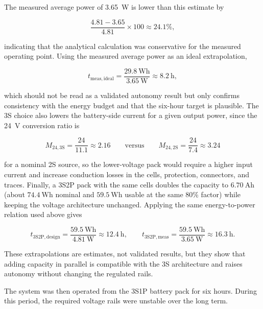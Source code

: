 The measured average power of 3.65~W is lower than this estimate by

\begin{equation}
\frac{4.81 - 3.65}{4.81}\times 100 \approx 24.1\%,
\end{equation}

indicating that the analytical calculation was conservative for the measured operating point. Using the measured average power as an ideal extrapolation,

\begin{equation}
t_{\mathrm{meas,ideal}} = \frac{29.8~\mathrm{Wh}}{3.65~\mathrm{W}} \approx 8.2~\mathrm{h},
\end{equation}

which should not be read as a validated autonomy result but only confirms consistency with the energy budget and that the six-hour target is plausible. The 3S choice also lowers the battery-side current for a given output power, since the 24~V conversion ratio is

\begin{equation}
M_{24,\mathrm{3S}} = \frac{24}{11.1} \approx 2.16 \qquad \text{versus} \qquad M_{24,\mathrm{2S}} = \frac{24}{7.4} \approx 3.24
\end{equation}

for a nominal 2S source, so the lower-voltage pack would require a higher input current and increase conduction losses in the cells, protection, connectors, and traces. Finally, a 3S2P pack with the same cells doubles the capacity to \(6.70~\mathrm{Ah}\) (about \(74.4~\mathrm{Wh}\) nominal and \(59.5~\mathrm{Wh}\) usable at the same 80\% factor) while keeping the voltage architecture unchanged. Applying the same energy-to-power relation used above gives

\begin{equation}
t_{\mathrm{3S2P,design}} = \frac{59.5~\mathrm{Wh}}{4.81~\mathrm{W}} \approx 12.4~\mathrm{h}, \qquad
t_{\mathrm{3S2P,meas}} = \frac{59.5~\mathrm{Wh}}{3.65~\mathrm{W}} \approx 16.3~\mathrm{h}.
\end{equation}

These extrapolations are estimates, not validated results, but they show that adding capacity in parallel is compatible with the 3S architecture and raises autonomy without changing the regulated rails.

The system was then operated from the 3S1P battery pack for six hours. During this period, the required voltage rails were unstable over the long term.

